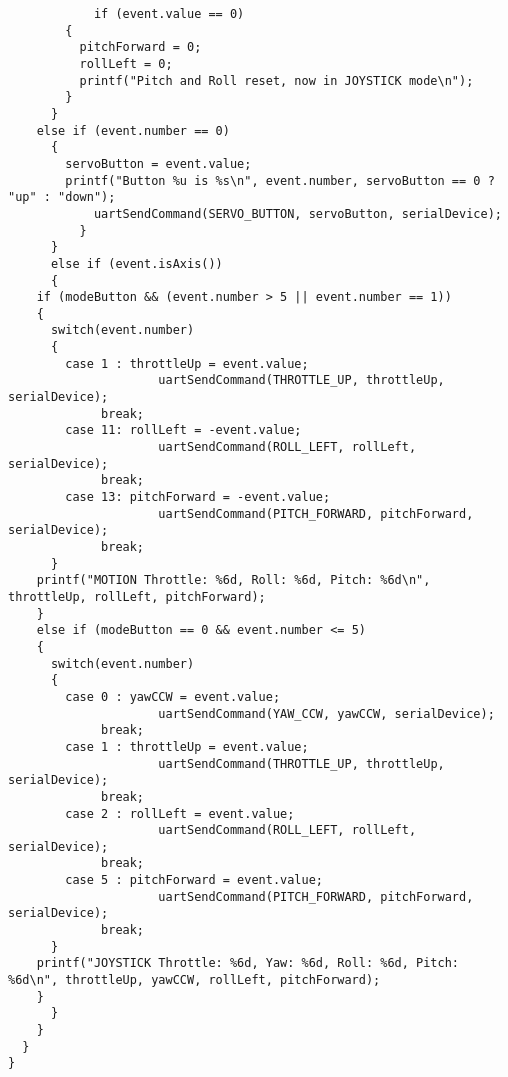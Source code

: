 \documentclass[a4paper,11pt]{article}
\begin{document}
\begin{lstlisting}
            if (event.value == 0)
	    {
	      pitchForward = 0;
	      rollLeft = 0;
	      printf("Pitch and Roll reset, now in JOYSTICK mode\n");
	    }
	  }
	else if (event.number == 0)
	  {
	    servoButton = event.value;
	    printf("Button %u is %s\n", event.number, servoButton == 0 ? "up" : "down");
            uartSendCommand(SERVO_BUTTON, servoButton, serialDevice);
          }
      }
      else if (event.isAxis())
      {
	if (modeButton && (event.number > 5 || event.number == 1))
	{
	  switch(event.number)
	  {
	    case 1 : throttleUp = event.value;
                     uartSendCommand(THROTTLE_UP, throttleUp, serialDevice);
		     break;
	    case 11: rollLeft = -event.value;
                     uartSendCommand(ROLL_LEFT, rollLeft, serialDevice);
		     break;
	    case 13: pitchForward = -event.value;
                     uartSendCommand(PITCH_FORWARD, pitchForward, serialDevice);
		     break;
	  }
	printf("MOTION Throttle: %6d, Roll: %6d, Pitch: %6d\n", throttleUp, rollLeft, pitchForward);
	}
	else if (modeButton == 0 && event.number <= 5)
	{
	  switch(event.number)
	  {
	    case 0 : yawCCW = event.value;
                     uartSendCommand(YAW_CCW, yawCCW, serialDevice);
		     break;
	    case 1 : throttleUp = event.value;
                     uartSendCommand(THROTTLE_UP, throttleUp, serialDevice);
		     break;
	    case 2 : rollLeft = event.value;
                     uartSendCommand(ROLL_LEFT, rollLeft, serialDevice);
		     break;
	    case 5 : pitchForward = event.value;
                     uartSendCommand(PITCH_FORWARD, pitchForward, serialDevice);
		     break;
	  }
	printf("JOYSTICK Throttle: %6d, Yaw: %6d, Roll: %6d, Pitch: %6d\n", throttleUp, yawCCW, rollLeft, pitchForward);
	}	
      }
    }
  }
}
\end{lstlisting}
\end{document}
